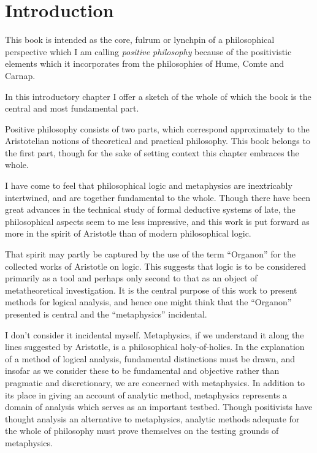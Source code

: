 \chapter{Introduction}\label{Introduction}

This book is intended as the core, fulrum or lynchpin of a
philosophical perspective which I am calling \emph{positive
  philosophy} because of the positivistic elements which it
incorporates from the philosophies of Hume, Comte and Carnap.

In this introductory chapter I offer a sketch of the whole of which
the book is the central and most fundamental part.

Positive philosophy consists of two parts, which correspond
approximately to the Aristotelian notions of theoretical and
practical philosophy.
This book belongs to the first part, though for the sake of setting
context this chapter embraces the whole.

I have come to feel that philosophical logic and metaphysics are
inextricably intertwined, and are together fundamental to the whole.
Though there have been great advances in the technical study of
formal deductive systems of late, the philosophical aspects seem to me
less impressive, and this work is put forward as more in the spirit of
Aristotle than of modern philosophical logic.

That spirit may partly be captured by the use of the term ``Organon''
for the collected works of Aristotle on logic.
This suggests that logic is to be considered primarily as a tool and
perhaps only second to that as an object of metatheoretical
investigation.
It is the central purpose of this work to present methods for logical
analysis, and hence one might think that the ``Organon'' presented is
central and the ``metaphysics'' incidental.

I don't consider it incidental myself.
Metaphysics, if we understand it along the lines suggested by
Aristotle, is a philosophical holy-of-holies.
In the explanation of a method of logical analysis, fundamental
distinctions must be drawn, and insofar as we consider these to be
fundamental and objective rather than pragmatic and discretionary, we
are concerned with metaphysics.
In addition to its place in giving an account of analytic method,
metaphysics represents a domain of analysis which serves as an
important testbed.
Though positivists have thought analysis an alternative to
metaphysics, analytic methods adequate for the whole of philosophy
must prove themselves on the testing grounds of metaphysics.

